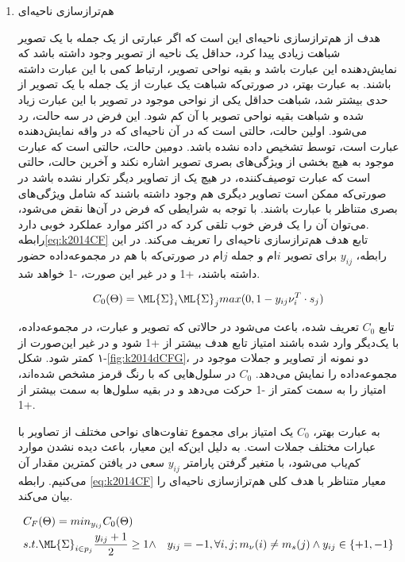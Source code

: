 \begin{enumerate}
\item هم‌ترازسازی ناحیه‌ای 

هدف از هم‌ترازسازی ناحیه‌ای این است که اگر عبارتی از یک جمله با یک تصویر شباهت زیادی پیدا کرد، حداقل یک ناحیه از تصویر وجود داشته باشد که نمایش‌دهنده این عبارت باشد و بقیه نواحی تصویر، ارتباط کمی با این عبارت داشته باشند. به عبارت بهتر، در صورتی‌که شباهت یک عبارت از یک جمله با یک تصویر از حدی بیشتر شد، شباهت حداقل یکی از نواحی موجود در تصویر با این عبارت زیاد شده و شباهت بقیه نواحی تصویر با آن کم شود. این فرض در سه حالت، رد می‌شود. اولین حالت، حالتی است که در آن ناحیه‌ای که در واقه نمایش‌دهنده عبارت است، توسط  تشخیص داده نشده باشد. دومین حالت، حالتی است که عبارت موجود به هیچ بخشی از ویژگی‌های بصری تصویر اشاره نکند و آخرین حالت، حالتی است که عبارت توصیف‌کننده، در هیچ یک از تصاویر دیگر تکرار نشده باشد در صورتی‌که ممکن است تصاویر دیگری هم وجود داشته باشند که شامل ویژگی‌های بصری متناظر با عبارت باشند. با توجه به شرایطی که فرض در آن‌ها نقض می‌شود، می‌توان آن را یک فرض خوب تلقی کرد که در اکثر موارد عملکرد خوبی دارد.
\\
رابطه\ref{eq:k2014CF}
تابع هدف هم‌ترازسازی ناحیه‌ای را تعریف‌ می‌کند. در این رابطه، $y_{ij}$ برای تصویر $i$ام و جمله $j$ام در صورتی‌که با هم در مجموعه‌داده حضور داشته باشند، +1 و در غیر این‌ صورت، -1 خواهد شد.

\begin{equation}
C_0(\Theta) = \ML{\Sigma}_i \ML{\Sigma}_j max(0 , 1 - y_{ij} \nu_i^T \cdot s_j)
\label{eq:k2014CF}
\end{equation}

تابع $C_0$ تعریف شده، باعث می‌شود در حالاتی که تصویر و عبارت، در مجموعه‌داده، با یک‌دیگر وارد شده باشند امتیاز تابع هدف بیشتر از +1 شود و در غیر این‌صورت از -۱ کمتر شود. شکل\ref{fig:k2014dCFG}،
 دو نمونه از تصاویر و جملات موجود در مجموعه‌داده را نمایش می‌دهد. 
 $C_0$ 
 در سلول‌هایی که با رنگ قرمز مشخص شده‌اند، امتیاز را به سمت کمتر از -1 حرکت می‌دهد و در بقیه سلول‌ها به سمت بیشتر از +1.

به عبارت بهتر، $C_0$ یک امتیاز برای مجموع تفاوت‌های نواحی مختلف از تصاویر با عبارات مختلف جملات است. به دلیل این‌که این معیار، باعث دیده نشدن موارد کم‌یاب می‌شود، با متغیر گرفتن پارامتر $y_{ij}$ سعی در یافتن کمترین مقدار آن می‌کنیم. رابطه 
\ref{eq:k2014CF}
معیار متناظر با هدف کلی هم‌ترازسازی ناحیه‌ای را بیان می‌کند.

\begin{align}
&C_F(\Theta) = min_{y_{ij}} C_0(\Theta)
\nonumber
\\
&s.t. \ML{\Sigma}_{i \in p_j} \frac{y_{ij} + 1}{2} \geq 1 \land
&y_{ij} = -1, \forall i,j ; m_\nu(i) \neq m_s(j) \land y_{ij} \in \{+1, -1\}
\label{eq:k2014CF}
\end{align}


\end{enumerate}
